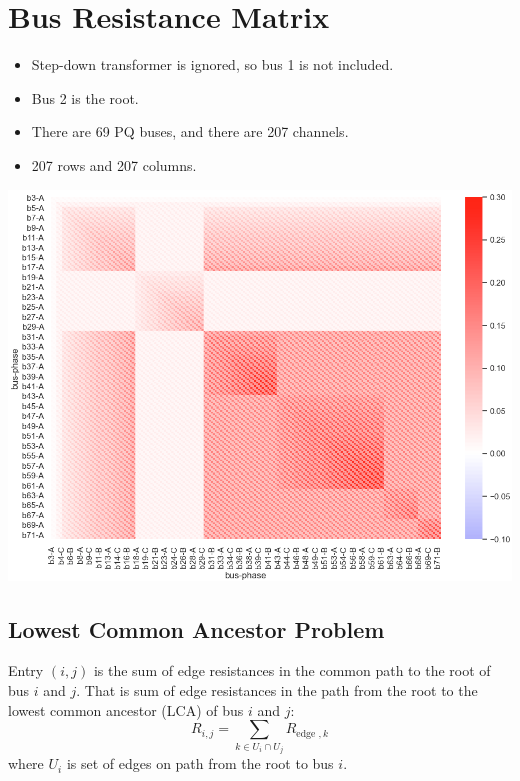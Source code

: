 \documentclass[
]{book}
\providecommand{\tightlist}{%
  \setlength{\itemsep}{0pt}\setlength{\parskip}{0pt}}
\begin{document}
\hypertarget{BRM}{%
\section{Bus Resistance Matrix}\label{BRM}}

\begin{itemize}
\tightlist
\item
  Step-down transformer is ignored, so bus 1 is not included.
\item
  Bus 2 is the root.
\item
  There are 69 PQ buses, and there are 207 channels.
\item
  207 rows and 207 columns.
\end{itemize}

\begin{center}\includegraphics{Pictures/figHeatmapBRM} \end{center}

\hypertarget{LCA}{%
\subsection*{Lowest Common Ancestor Problem}\label{LCA}}

Entry \((i, j)\) is the sum of edge resistances in the common path to the root of
bus \(i\) and \(j\). That is sum of edge resistances in the path from the root to
the lowest common ancestor (LCA) of bus \(i\) and \(j\):
\[
R_{i, j}=\sum_{k \in U_{i} \cap U_{j}} R_{\text {edge }, k}
\]
where \(U_{i}\) is set of edges on path from the root to bus \(i\).
\end{document}
